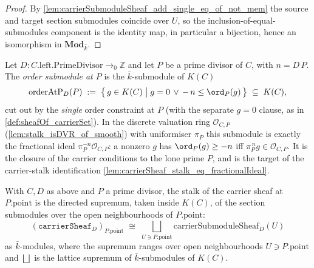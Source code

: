 \begin{proof}
  By \cref{lem:carrierSubmoduleSheaf_add_single_eq_of_not_mem} the source and
  target section submodules coincide over \(U\), so the
  inclusion-of-equal-submodules component is the identity map, in particular a
  bijection, hence an isomorphism in \(\mathbf{Mod}_{\bar k}\).
\end{proof}

\begin{definition}

  \label{def:sheafOf_orderAtPSubmodule}
  Let \(D : C.\mathrm{left.PrimeDivisor} \to_0 \mathbb Z\) and let \(P\) be a
  prime divisor of \(C\), with \(n = D\,P\). The \emph{order submodule at \(P\)}
  is the \(\bar k\)-submodule of \(K(C)\)
  \[
    \mathrm{orderAtP}_D(P) \;:=\;
    \bigl\{\, g \in K(C) \;\big|\; g = 0 \,\lor\, -\,n \le \ord_P(g) \,\bigr\}
    \;\subseteq\; K(C),
  \]
  cut out by the \emph{single} order constraint at \(P\) (with the separate
  \(g = 0\) clause, as in \cref{def:sheafOf_carrierSet}). In the discrete
  valuation ring \(\mathcal O_{C,P}\) (\cref{lem:stalk_isDVR_of_smooth}) with
  uniformiser \(\pi_P\) this submodule is exactly the fractional ideal
  \(\pi_P^{-n}\mathcal O_{C,P}\): a nonzero \(g\) has \(\ord_P(g) \ge -n\) iff
  \(\pi_P^{\,n} g \in \mathcal O_{C,P}\). It is the closure of the carrier
  conditions to the lone prime \(P\), and is the target of the carrier-stalk
  identification \cref{lem:carrierSheaf_stalk_eq_fractionalIdeal}.
\end{definition}

\begin{lemma}

  \label{lem:carrierSheaf_stalk_iso_iSup}
  With \(C, D\) as above and \(P\) a prime divisor, the stalk of the carrier
  sheaf at \(P.\mathrm{point}\) is the directed supremum, taken inside \(K(C)\),
  of the section submodules over the open neighbourhoods of \(P.\mathrm{point}\):
  \[
    (\texttt{carrierSheaf}_D)_{P.\mathrm{point}} \;\cong\;
    \bigsqcup_{U \ni P.\mathrm{point}}
        \mathrm{carrierSubmoduleSheaf}_D(U)
  \]
  as \(\bar k\)-modules, where the supremum ranges over open
  neighbourhoods \(U \ni P.\mathrm{point}\) and \(\bigsqcup\) is the lattice
  supremum of \(\bar k\)-submodules of \(K(C)\).
\end{lemma}

